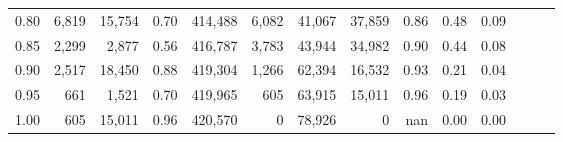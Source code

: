 \begin{tabular}{rrrrrrrrrrrrrr}
0.80 &   6,819 &  15,754 &  0.70 &  414,488 &    6,082 &  41,067 &  37,859 &  0.86 &  0.48 &      0.09 \\
0.85 &   2,299 &   2,877 &  0.56 &  416,787 &    3,783 &  43,944 &  34,982 &  0.90 &  0.44 &      0.08 \\
0.90 &   2,517 &  18,450 &  0.88 &  419,304 &    1,266 &  62,394 &  16,532 &  0.93 &  0.21 &      0.04 \\
0.95 &     661 &   1,521 &  0.70 &  419,965 &      605 &  63,915 &  15,011 &  0.96 &  0.19 &      0.03 \\
1.00 &     605 &  15,011 &  0.96 &  420,570 &        0 &  78,926 &       0 &   nan &  0.00 &      0.00 \\
\bottomrule
\end{tabular}
